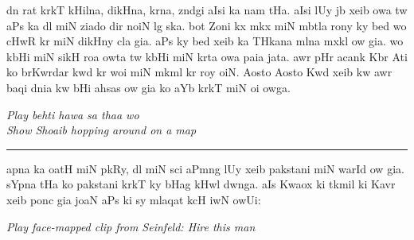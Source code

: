 \documentclass{article}
\begin{document}
	dn rat krkT kHilna, dikHna,  krna, zndgi aIsi ka nam tHa.
	aIsi lUy jb xeib  owa tw aPs ka dl  miN ziado dir noiN lg ska.
	bot Zoni kx mkx miN mbtla rony ky bed wo  cHwR kr  miN  dikHny cla gia.
	aPs ky bed xeib ka THkana mlna mxkl ow gia.
	wo kbHi  miN  sikH roa owta tw kbHi  miN  krta owa paia jata.
	awr pHr acank Kbr Ati ko brKwrdar  kwd kr woi  miN mkml kr roy oiN. 
	Aosto Aosto Kwd xeib kw awr baqi dnia kw bHi ahsas ow gia ko aYb  krkT miN oi owga.

\begin{enpara}
	\itshape
	Play behti hawa sa thaa wo\\
	Show Shoaib hopping around on a map
\end{enpara}

\rule{\textwidth}{1pt}

	apna  ka  oatH miN pkRy, dl miN sci aPmng lUy xeib pakstani miN warId ow gia.
	sYpna tHa ko pakstani krkT ky bHag kHwl dwnga.
	aIs Kwaox ki tkmil ki Kavr xeib  ponc gia joaN aPs ki  sy mlaqat kcH iwN owUi: 

\begin{enpara}
	\itshape
	Play face-mapped clip from Seinfeld: Hire this man
\end{enpara}
\end{document}
